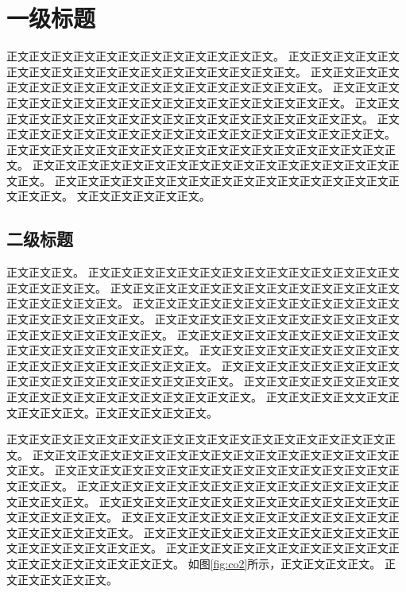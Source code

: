 
\chapter{一级标题}
正文正文正文正文正文正文正文正文正文正文正文正文\cite{zhang_study_2013}。
正文正文正文正文正文正文正文正文正文正文正文正文正文正文正文正文正文正文。
正文正文正文正文正文正文正文正文正文正文正文正文正文正文正文正文正文正文。
正文正文正文正文正文正文正文正文正文正文正文正文正文正文正文正文正文正文。
正文正文正文正文正文正文正文正文正文正文正文正文正文正文正文正文正文正文。
正文正文正文正文正文正文正文正文正文正文正文正文正文正文正文正文正文正文。
正文正文正文正文正文正文正文正文正文正文正文正文正文正文正文正文正文正文。
正文正文正文正文正文正文正文正文正文正文正文正文正文正文正文正文正文正文。
正文正文正文正文正文正文正文正文正文正文正文正文正文正文正文正文正文正文。
文正文正文正文正文正文。

\section{二级标题}
正文正文正文\cite{chen_problem-solving_2019,dasgupta_handbook_2018}。
正文正文正文正文正文正文正文正文正文正文正文正文正文正文正文正文正文正文。
正文正文正文正文正文正文正文正文正文正文正文正文正文正文正文正文正文正文。
正文正文正文正文正文正文正文正文正文正文正文正文正文正文正文正文正文正文。
正文正文正文正文正文正文正文正文正文正文正文正文正文正文正文正文正文正文。
正文正文正文正文正文正文正文正文正文正文正文正文正文正文正文正文正文正文。
正文正文正文正文正文正文正文正文正文正文正文正文正文正文正文正文正文正文。
正文正文正文正文正文正文正文正文正文正文正文正文正文正文正文正文正文正文。
正文正文正文正文正文正文正文正文正文正文正文正文正文正文正文正文正文正文。
正文正文正文正文文正文正文正文正文正文\cite{barberis_survey_2003,
heckman_chapter_2007,__2014}。正文正文正文正文正文\cite{__2015}。

正文正文正文正文正文正文正文正文正文正文正文正文正文正文正文正文正文正文。
正文正文正文正文正文正文正文正文正文正文正文正文正文正文正文正文正文正文。
正文正文正文正文正文正文正文正文正文正文正文正文正文正文正文正文正文正文。
正文正文正文正文正文正文正文正文正文正文正文正文正文正文正文正文正文正文。
正文正文正文正文正文正文正文正文正文正文正文正文正文正文正文正文正文正文。
正文正文正文正文正文正文正文正文正文正文正文正文正文正文正文正文正文正文。
正文正文正文正文正文正文正文正文正文正文正文正文正文正文正文正文正文正文。
正文正文正文正文正文正文正文正文正文正文正文正文正文正文正文正文正文正文。
如图\ref{fig:co2}所示，正文正文正文正文\cite{yin_quantifying_2019}。
正文正文正文正文正文。

